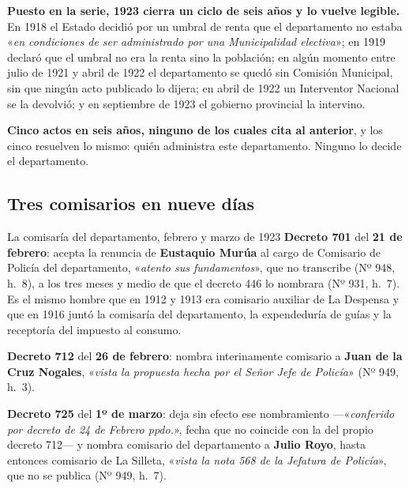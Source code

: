 \begin{cautela}
\textbf{Puesto en la serie, 1923 cierra un ciclo de seis años y lo vuelve legible.} En 1918 el
Estado decidió por un umbral de renta que el departamento no estaba «\textit{en condiciones de
ser administrado por una Municipalidad electiva}»; en 1919 declaró que el umbral no era la renta
sino la población; en algún momento entre julio de 1921 y abril de 1922 el departamento se quedó
sin Comisión Municipal, sin que ningún acto publicado lo dijera; en abril de 1922 un Interventor
Nacional se la devolvió; y en septiembre de 1923 el gobierno provincial la intervino.

\textbf{Cinco actos en seis años, ninguno de los cuales cita al anterior}, y los cinco resuelven
lo mismo: quién administra este departamento. Ninguno lo decide el departamento.
\end{cautela}

\subsection*{Tres comisarios en nueve días}

\begin{ficha}{La comisaría del departamento, febrero y marzo de 1923}
\textbf{Decreto 701} del \textbf{21 de febrero}: acepta la renuncia de \textbf{Eustaquio
Murúa} al cargo de Comisario de Policía del departamento, «\textit{atento
sus fundamentos}», que no transcribe (Nº 948, h.\ 8), a los tres meses y medio de que el
decreto 446 lo nombrara (Nº 931, h.\ 7). Es el mismo hombre que en 1912 y 1913 era
comisario auxiliar de La Despensa y que en 1916 juntó la comisaría del departamento, la
expendeduría de guías y la receptoría del impuesto al consumo.

\textbf{Decreto 712} del \textbf{26 de febrero}: nombra interinamente comisario a \textbf{Juan de
la Cruz Nogales}, «\textit{vista la propuesta hecha por el Señor Jefe de Policía}» (Nº 949,
h.\ 3).

\textbf{Decreto 725} del \textbf{1º de marzo}: deja sin efecto ese nombramiento ---«\textit{conferido
por decreto de 24 de Febrero ppdo.}», fecha que no coincide con la del propio decreto 712--- y
nombra comisario del departamento a \textbf{Julio Royo}, hasta entonces comisario de La Silleta,
«\textit{vista la nota 568 de la Jefatura de Policía}», que no se publica (Nº 949, h.\ 7).
\end{ficha}

